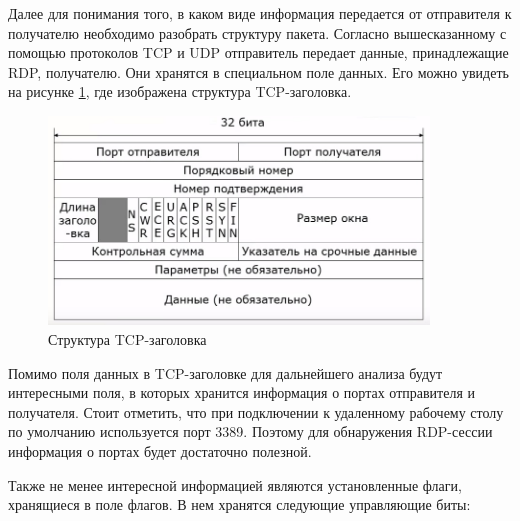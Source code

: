 \documentclass[bachelor, och, coursework]{SCWorks}
\begin{document}
    Далее для понимания того, в каком виде информация передается от отправителя к получателю необходимо разобрать структуру пакета.
    Согласно вышесказанному с помощью протоколов TCP и UDP отправитель передает данные, принадлежащие RDP, получателю. Они хранятся в специальном поле данных.
    Его можно увидеть на рисунке \ref{tcp-header}, где изображена структура TCP-заголовка.
    
      \begin{figure}[H]
        \centering
        \includegraphics[width=0.9\textwidth]{photo/tcp-segment.jpg}
        \caption{Структура TCP-заголовка}
        \label{tcp-header}
      \end{figure}
      
    Помимо поля данных в TCP-заголовке для дальнейшего анализа будут интересными поля, в которых хранится информация о портах отправителя и получателя.
    Стоит отметить, что при подключении к удаленному рабочему столу по умолчанию используется порт 3389. Поэтому для обнаружения RDP-сессии
    информация о портах будет достаточно полезной.

    Также не менее интересной информацией являются установленные флаги, хранящиеся в поле флагов. В нем хранятся следующие управляющие биты:
\end{document}
